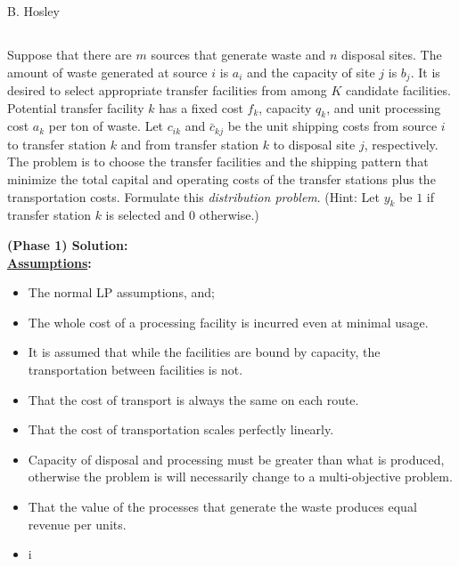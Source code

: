 \documentclass[12pt]{amsart}
\begin{document}
\raggedbottom

\hspace{\fill} {\large B. Hosley}
\bigskip


\setcounter{section}{1}
\setcounter{subsection}{24}
\subsection{} 

Suppose that there are \(m\) sources that generate waste and \(n\) disposal sites. 
The amount of waste generated at source \(i\) is \(a_i\) and the capacity of site \(j\) is \(b_j\). 
It is desired to select appropriate transfer facilities from among \(K\) candidate 
facilities. Potential transfer facility \(k\) has a fixed cost \(f_k\), capacity \(q_k\), and unit 
processing cost \(a_k\) per ton of waste. Let \(c_{ik}\) and \(\bar c_{kj}\) be the unit shipping costs 
from source \(i\) to transfer station \(k\) and from transfer station \(k\) to disposal site  \(j\), 
respectively. The problem is to choose the transfer facilities and the shipping 
pattern that minimize the total capital and operating costs of the transfer stations 
plus the transportation costs. Formulate this \textit{distribution problem}. (Hint: Let \(y_k\) 
be \(1\) if transfer station \(k\) is selected and \(0\) otherwise.) \\ \bigskip


\textbf{(Phase 1) Solution:} \\

\textbf{\underline{Assumptions}:}

\begin{itemize}
	\item The normal LP assumptions, and;
	\item The whole cost of a processing facility is incurred even at minimal usage.
	\item It is assumed that while the facilities are bound by capacity, the transportation
	between facilities is not.
	\item That the cost of transport is always the same on each route.
	\item That the cost of transportation scales perfectly linearly.
	\item Capacity of disposal and processing must be greater than what is produced, 
	otherwise the problem is will necessarily change to a multi-objective problem.
	\item That the value of the processes that generate the waste produces equal revenue
	per units.
	\item i
\end{itemize} \bigskip
\end{document}
